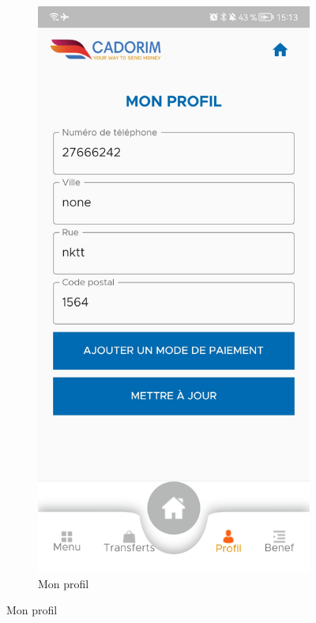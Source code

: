 \begin{itemize}[label=$\ast$]
\begin{figure}
\begin{subfigure}[b]{0.3\textwidth}
		\includegraphics[width=\textwidth]{./Template LaTeX/Images/6.jpg}
		\caption{Mon profil}
		\label{fig:y equals x}
	\end{subfigure}

\end{figure}
\end{itemize}
